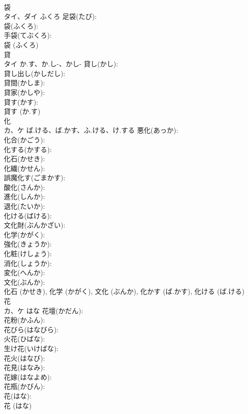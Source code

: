 \documentclass[8pt]{extreport}
\begin{document}
\begin{CJK}{UTF8}{min}
\\	袋			
\\	タイ、ダイ	ふくろ	足袋(たび): 
\\	袋(ふくろ): 
\\	手袋(てぶくろ): 
\\	袋 (ふくろ)
\\	貸			
\\	タイ	か.す、か.し-、かし-	貸し(かし): 
\\	貸し出し(かしだし): 
\\	貸間(かしま): 
\\	貸家(かしや): 
\\	貸す(かす): 
\\	貸す (か.す)
\\	化			
\\	カ、ケ	ば.ける、ば.かす、ふ.ける、け.する	悪化(あっか): 
\\	化合(かごう): 
\\	化する(かする): 
\\	化石(かせき): 
\\	化繊(かせん): 
\\	誤魔化す(ごまかす): 
\\	酸化(さんか): 
\\	進化(しんか): 
\\	退化(たいか): 
\\	化ける(ばける): 
\\	文化財(ぶんかざい): 
\\	化学(かがく): 
\\	強化(きょうか): 
\\	化粧(けしょう): 
\\	消化(しょうか): 
\\	変化(へんか): 
\\	文化(ぶんか): 
\\	化石 (かせき), 化学 (かがく), 文化 (ぶんか), 化かす (ば.かす), 化ける (ば.ける)
\\	花			
\\	カ、ケ	はな	花壇(かだん): 
\\	花粉(かふん): 
\\	花びら(はなびら): 
\\	火花(ひばな): 
\\	生け花(いけばな): 
\\	花火(はなび): 
\\	花見(はなみ): 
\\	花嫁(はなよめ): 
\\	花瓶(かびん): 
\\	花(はな): 
\\	花 (はな)

\end{CJK}
\end{document}
